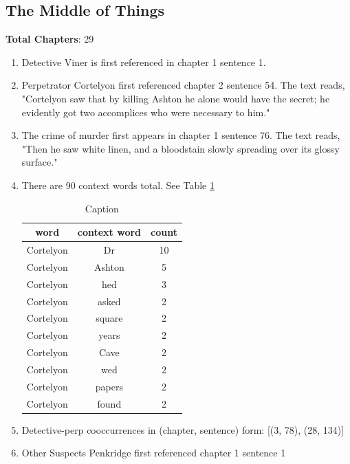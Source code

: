 \documentclass{article}
\begin{document}
\subsection{The Middle of Things}
\textbf{Total Chapters}: 29 \\
\begin{enumerate}
    \item Detective Viner is first referenced in chapter 1 sentence 1. \\
    \item Perpetrator Cortelyon first referenced chapter 2 sentence 54. The text reads, "Cortelyon saw that by killing Ashton he alone would have the secret; he evidently got two accomplices who were necessary to him." \\
    \item The crime of murder first appears in chapter 1 sentence 76. The text reads, "Then he saw white linen, and a bloodstain slowly spreading over its glossy surface." \\
    \item There are 90 context words total. See Table \ref{tab:tmot} \\
    \begin{table}[]
        \centering
        \begin{tabular}{c|c|c}
        word & context word & count \\ \hline
Cortelyon & Dr & 10 \\
Cortelyon & Ashton & 5 \\
Cortelyon & hed & 3 \\
Cortelyon & asked & 2 \\
Cortelyon & square & 2 \\
Cortelyon & years & 2 \\
Cortelyon & Cave & 2 \\
Cortelyon & wed & 2 \\
Cortelyon & papers & 2 \\
Cortelyon & found & 2 \\
        \end{tabular}
        \caption{Caption}
        \label{tab:tmot}
    \end{table}
    \item Detective-perp cooccurrences in (chapter, sentence) form: [(3, 78), (28, 134)] \\
    \item Other Suspects Penkridge first referenced chapter 1 sentence 1 \\
\end{enumerate}
\end{document}
